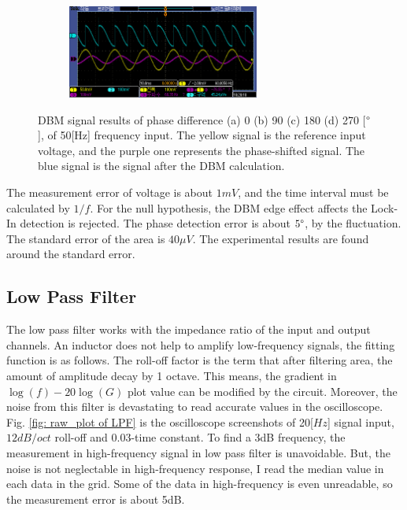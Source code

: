 \documentclass{article}
\begin{document}
\begin{figure}[ht]
\begin{subfigure}[b]{6.3cm}
  \centering
  \includegraphics[width=6.3cm]{../raw_data/TEK00358.PNG}
  \caption{}
\end{subfigure}
\hfill
  \caption{DBM signal results of phase difference (a) 0 (b) 90 (c) 180 (d) 270 [$\degree$], of 50[Hz] frequency input.
      The yellow signal is the reference input voltage, and the purple one represents the phase-shifted signal.
      The blue signal is the signal after the DBM calculation.
   }
  \label{fig: DBM_plot}
\end{figure}

The measurement error of voltage is about $1mV$, and the time interval must be calculated by $1/f$.
For the null hypothesis, the DBM edge effect affects the Lock-In detection is rejected.
The phase detection error is about $5 \degree$, by the fluctuation.
The standard error of the area is $40 \mu V$.
The experimental results are found around the standard error.



\subsection{Low Pass Filter}
\label{results: low pass filter}

 The low pass filter works with the impedance ratio of the input and output channels.
 An inductor does not help to amplify low-frequency signals, the fitting function is as follows.
 The roll-off factor is the term that after filtering area, the amount of amplitude decay by 1 octave.
 This means, the gradient in $\log(f) - 20\log(G)$ plot value can be modified by the circuit.
 Moreover, the noise from this filter is devastating to read accurate values in the oscilloscope.
 Fig. \ref{fig: raw_plot of LPF} is the oscilloscope screenshots of 20[$Hz$] signal input, $12 dB/oct$ roll-off and 0.03-time constant.
 To find a 3dB frequency, the measurement in high-frequency signal in low pass filter is unavoidable.
 But, the noise is not neglectable in high-frequency response, I read the median value in each data in the grid.
 Some of the data in high-frequency is even unreadable, so the measurement error is about 5dB.
\end{document}
